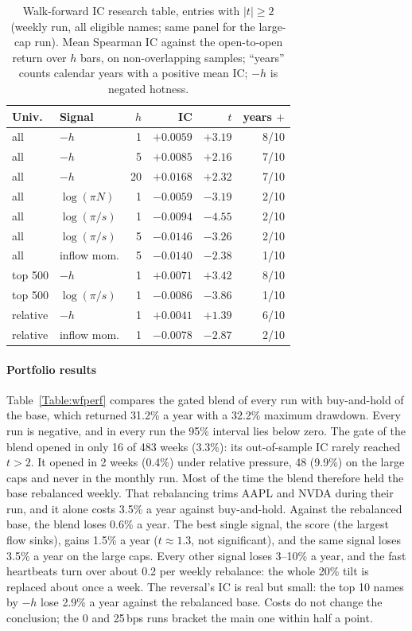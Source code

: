 \documentclass[preprint,3p,twocolumn]{elsarticle}
\begin{document}
\begin{table}[t]
\centering
\caption{Walk-forward IC research table, entries with $|t|\ge2$ (weekly run, all eligible names; same panel for the large-cap run). Mean Spearman IC against the open-to-open return over $h$ bars, on non-overlapping samples; ``years'' counts calendar years with a positive mean IC; $-h$ is negated hotness.}
\label{Table:wfic}
\small\setlength{\tabcolsep}{3pt}
\begin{tabular}{llrrrr}
\toprule
Univ. & Signal & $h$ & IC & $t$ & years $+$\\
\midrule
all & $-h$ & 1 & $+0.0059$ & $+3.19$ & 8/10\\
all & $-h$ & 5 & $+0.0085$ & $+2.16$ & 7/10\\
all & $-h$ & 20 & $+0.0168$ & $+2.32$ & 7/10\\
all & $\log(\pi N)$ & 1 & $-0.0059$ & $-3.19$ & 2/10\\
all & $\log(\pi/s)$ & 1 & $-0.0094$ & $-4.55$ & 2/10\\
all & $\log(\pi/s)$ & 5 & $-0.0146$ & $-3.26$ & 2/10\\
all & inflow mom. & 5 & $-0.0140$ & $-2.38$ & 1/10\\
top 500 & $-h$ & 1 & $+0.0071$ & $+3.42$ & 8/10\\
top 500 & $\log(\pi/s)$ & 1 & $-0.0086$ & $-3.86$ & 1/10\\
relative & $-h$ & 1 & $+0.0041$ & $+1.39$ & 6/10\\
relative & inflow mom. & 1 & $-0.0078$ & $-2.87$ & 2/10\\
\bottomrule
\end{tabular}
\end{table}

\paragraph{Portfolio results} Table~\ref{Table:wfperf} compares the gated blend of every run with buy-and-hold of the base, which returned 31.2\% a year with a 32.2\% maximum drawdown. Every run is negative, and in every run the 95\% interval lies below zero. The gate of the blend opened in only 16 of 483 weeks (3.3\%): its out-of-sample IC rarely reached $t>2$. It opened in 2 weeks (0.4\%) under relative pressure, 48 (9.9\%) on the large caps and never in the monthly run. Most of the time the blend therefore held the base rebalanced weekly. That rebalancing trims AAPL and NVDA during their run, and it alone costs 3.5\% a year against buy-and-hold. Against the rebalanced base, the blend loses 0.6\% a year. The best single signal, the score (the largest flow sinks), gains 1.5\% a year ($t\approx1.3$, not significant), and the same signal loses 3.5\% a year on the large caps. Every other signal loses 3--10\% a year, and the fast heartbeats turn over about 0.2 per weekly rebalance: the whole 20\% tilt is replaced about once a week. The reversal's IC is real but small: the top 10 names by $-h$ lose 2.9\% a year against the rebalanced base. Costs do not change the conclusion; the 0 and 25\,bps runs bracket the main one within half a point.
\end{document}
